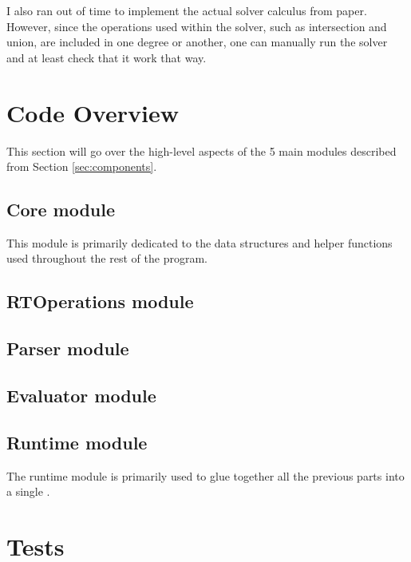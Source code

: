 \documentclass[letterpaper, 11pt]{article}
\begin{document}
I also ran out of time to implement the actual solver calculus from paper.
However, since the operations used within the solver, such as intersection and union, are included in one degree or another, one can manually run the solver and at least check that it work that way.

\section{Code Overview}\label{sec:code}
This section will go over the high-level aspects of the 5 main modules described from Section \ref*{sec:components}.
\subsection{Core module}\label{code:core}
This module is primarily dedicated to the data structures and helper functions used throughout the rest of the program.

\subsection{RTOperations module}\label{code:rtops}


\subsection{Parser module}\label{code:parse}


\subsection{Evaluator module}\label{code:eval}


\subsection{Runtime module}\label{code:runtime}
The runtime module is primarily used to glue together all the previous parts into a single .

\section{Tests}\label{sec:tests}
\end{document}
